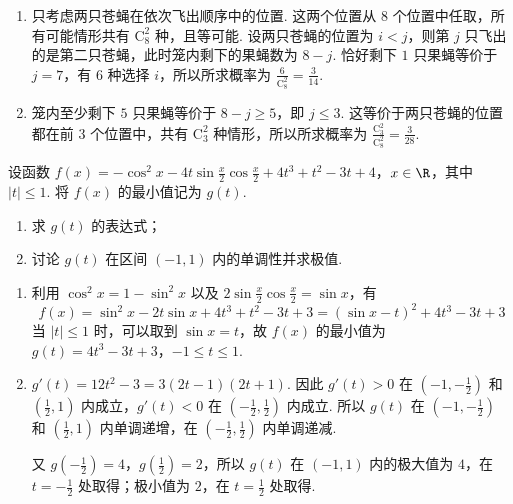 \begin{solution}
\begin{enumerate}
\item 只考虑两只苍蝇在依次飞出顺序中的位置. 这两个位置从 \(8\) 个位置中任取，所有可能情形共有 \(\mathrm C_{8}^{2}\) 种，且等可能. 设两只苍蝇的位置为 \(i<j\)，则第 \(j\) 只飞出的是第二只苍蝇，此时笼内剩下的果蝇数为 \(8-j\). 恰好剩下 \(1\) 只果蝇等价于 \(j=7\)，有 \(6\) 种选择 \(i\)，所以所求概率为 \(\frac{6}{\mathrm C_{8}^{2}}=\frac3{14}\).
\item 笼内至少剩下 \(5\) 只果蝇等价于 \(8-j\geqslant5\)，即 \(j\leqslant3\). 这等价于两只苍蝇的位置都在前 \(3\) 个位置中，共有 \(\mathrm C_{3}^{2}\) 种情形，所以所求概率为 \(\frac{\mathrm C_{3}^{2}}{\mathrm C_{8}^{2}}=\frac3{28}\).
\end{enumerate}
\end{solution}

\begin{problem}
设函数 \(f(x) = -\cos^2 x - 4t\sin \frac{x}{2}\cos \frac{x}{2} + 4t^3 + t^2 - 3t + 4\)，\(x \in \R\)，其中 \( |t| \leqslant 1 \). 将 \( f(x) \) 的最小值记为 \( g(t) \).

\begin{enumerate}
\item 求 \( g(t) \) 的表达式；
\item 讨论 \(g(t)\) 在区间 \((-1, 1)\) 内的单调性并求极值.
\end{enumerate}
\end{problem}

\begin{solution}
\begin{enumerate}
\item 利用 \(\cos^{2}x=1-\sin^{2}x\) 以及 \(2\sin\frac{x}{2}\cos\frac{x}{2}=\sin x\)，有
\[
f(x)=\sin^{2}x-2t\sin x+4t^{3}+t^{2}-3t+3
=(\sin x-t)^{2}+4t^{3}-3t+3
\]
当 \(|t|\leqslant1\) 时，可以取到 \(\sin x=t\)，故 \(f(x)\) 的最小值为
\(g(t)=4t^{3}-3t+3\)，\(-1\leqslant t\leqslant1\).
\item \(g'(t)=12t^{2}-3=3(2t-1)(2t+1)\). 因此 \(g'(t)>0\) 在 \((-1,-\frac12)\) 和 \((\frac12,1)\) 内成立，\(g'(t)<0\) 在 \((-\frac12,\frac12)\) 内成立. 所以 \(g(t)\) 在 \((-1,-\frac12)\) 和 \((\frac12,1)\) 内单调递增，在 \((-\frac12,\frac12)\) 内单调递减.

又 \(g(-\frac12)=4\)，\(g(\frac12)=2\)，所以 \(g(t)\) 在 \((-1,1)\) 内的极大值为 \(4\)，在 \(t=-\frac12\) 处取得；极小值为 \(2\)，在 \(t=\frac12\) 处取得.
\end{enumerate}
\end{solution}

